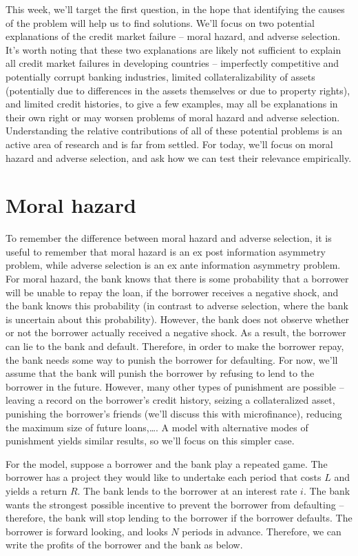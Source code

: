 \documentclass[12pt,english]{article}
\begin{document}
This week, we'll target the first question, in the hope that identifying the causes of the problem will help us to find solutions. We'll focus on two potential explanations of the credit market failure -- moral hazard, and adverse selection. It's worth noting that these two explanations are likely not sufficient to explain all credit market failures in developing countries -- imperfectly competitive and potentially corrupt banking industries, limited collateralizability of assets (potentially due to differences in the assets themselves or due to property rights), and limited credit histories, to give a few examples, may all be explanations in their own right or may worsen problems of moral hazard and adverse selection. Understanding the relative contributions of all of these potential problems is an active area of research and is far from settled. For today, we'll focus on moral hazard and adverse selection, and ask how we can test their relevance empirically.

\section{Moral hazard}

To remember the difference between moral hazard and adverse selection, it is useful to remember that moral hazard is an ex post information asymmetry problem, while adverse selection is an ex ante information asymmetry problem. For moral hazard, the bank knows that there is some probability that a borrower will be unable to repay the loan, if the borrower receives a negative shock, and the bank knows this probability (in contrast to adverse selection, where the bank is uncertain about this probability). However, the bank does not observe whether or not the borrower actually received a negative shock. As a result, the borrower can lie to the bank and default. Therefore, in order to make the borrower repay, the bank needs some way to punish the borrower for defaulting. For now, we'll assume that the bank will punish the borrower by refusing to lend to the borrower in the future. However, many other types of punishment are possible -- leaving a record on the borrower's credit history, seizing a collateralized asset, punishing the borrower's friends (we'll discuss this with microfinance), reducing the maximum size of future loans,\ldots. A model with alternative modes of punishment yields similar results, so we'll focus on this simpler case.

For the model, suppose a borrower and the bank play a repeated game. The borrower has a project they would like to undertake each period that costs $L$ and yields a return $R$. The bank lends to the borrower at an interest rate $i$. The bank wants the strongest possible incentive to prevent the borrower from defaulting -- therefore, the bank will stop lending to the borrower if the borrower defaults. The borrower is forward looking, and looks $N$ periods in advance. Therefore, we can write the profits of the borrower and the bank as below.
\end{document}
